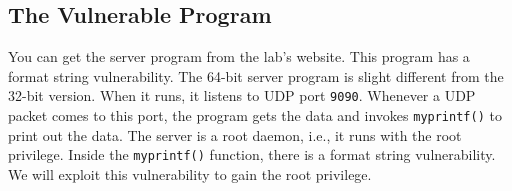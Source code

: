 \subsection{The Vulnerable Program}

You can get the server program from the lab's website. 
This program has a format string vulnerability.
The 64-bit server program is slight different from the 32-bit version. 
When it runs, it listens to UDP port
\texttt{9090}. Whenever a UDP packet comes to this port, the program
gets the data and invokes \texttt{myprintf()} to print out the data. 
The server is a root daemon, i.e., it runs with the root privilege. 
Inside the \texttt{myprintf()} function, there is a format string
vulnerability. We will exploit this vulnerability to gain the root
privilege.  

